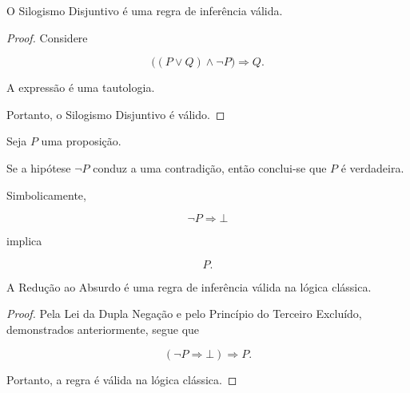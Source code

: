 \documentclass[../../main]{subfiles}
\begin{document}
\begin{prop}
	\label{prop:matematica:logica-matematica:regras-de-inferencia:validade-silogismo-disjuntivo}

	O Silogismo Disjuntivo é uma regra de inferência válida.
\end{prop}

\begin{proof}

	Considere

	\[
		\bigl(
		(P \lor Q)
		\land
		\neg P
		\bigr)
		\Rightarrow
		Q.
	\]

	A expressão é uma tautologia.

	Portanto, o Silogismo Disjuntivo é válido.

\end{proof}

\begin{defn}
	\label{def:matematica:logica-matematica:regras-de-inferencia:reducao-ao-absurdo}

	Seja \(P\) uma proposição.

	Se a hipótese \(\neg P\) conduz a uma contradição, então conclui-se
	que \(P\) é verdadeira.

	Simbolicamente,

	\[
		\neg P
		\Rightarrow
		\bot
	\]

	implica

	\[
		P.
	\]

\end{defn}

\begin{prop}
	\label{prop:matematica:logica-matematica:regras-de-inferencia:validade-reducao-ao-absurdo}

	A Redução ao Absurdo é uma regra de inferência válida na lógica
	clássica.
\end{prop}

\begin{proof}

	Pela Lei da Dupla Negação e pelo Princípio do Terceiro Excluído,
	demonstrados anteriormente, segue que

	\[
		(\neg P \Rightarrow \bot)
		\Rightarrow
		P.
	\]

	Portanto, a regra é válida na lógica clássica.

\end{proof}
\end{document}
